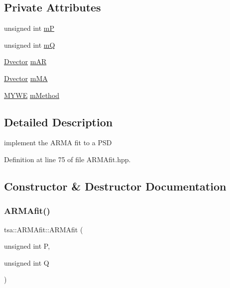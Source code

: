 \subsection*{Private Attributes}
\begin{DoxyCompactItemize}
\item 
unsigned int \hyperlink{classtsa_1_1_a_r_m_afit_a3662ce6508ec15a23142d30b44d08d8f}{mP}
\item 
unsigned int \hyperlink{classtsa_1_1_a_r_m_afit_abd0fb899f5347f145662e0fa53a1a0ba}{mQ}
\item 
\hyperlink{namespacetsa_a8900fb03d849baf447a1a0efe2561fb2}{Dvector} \hyperlink{classtsa_1_1_a_r_m_afit_a7aae186f74f8278099f8affc538baaf0}{m\+AR}
\item 
\hyperlink{namespacetsa_a8900fb03d849baf447a1a0efe2561fb2}{Dvector} \hyperlink{classtsa_1_1_a_r_m_afit_a3d7c0d01ce395406f72e6b17390a0a50}{m\+MA}
\item 
\hyperlink{classtsa_1_1_m_y_w_e}{M\+Y\+WE} \hyperlink{classtsa_1_1_a_r_m_afit_ae5d14a43af0447f8f64361e050631919}{m\+Method}
\end{DoxyCompactItemize}


\subsection{Detailed Description}
implement the A\+R\+MA fit to a P\+SD 

Definition at line 75 of file A\+R\+M\+Afit.\+hpp.



\subsection{Constructor \& Destructor Documentation}
\mbox{\label{classtsa_1_1_a_r_m_afit_ad55e4fccddc92e18f99276486d281ba8}} 
\subsubsection{\texorpdfstring{A\+R\+M\+Afit()}{ARMAfit()}}
{\footnotesize\ttfamily tsa\+::\+A\+R\+M\+Afit\+::\+A\+R\+M\+Afit (\begin{DoxyParamCaption}\item[{unsigned int}]{P,  }\item[{unsigned int}]{Q }\end{DoxyParamCaption})}

